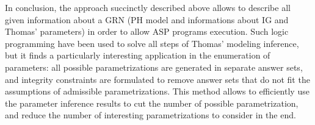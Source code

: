 In conclusion, the approach succinctly described above allows to describe all given information about a GRN (PH model and informations about IG and Thomas' parameters) in order to allow ASP programs execution.
Such logic programming have been used to solve all steps of Thomas' modeling inference, but it finds a particularly interesting application in the enumeration of parameters: all possible parametrizations are generated in separate answer sets, and integrity constraints are formulated to remove answer sets that do not fit the assumptions of admissible parametrizations.
This method allows to efficiently use the parameter inference results to cut the number of possible parametrization, and reduce the number of interesting parametrizations to consider in the end.
